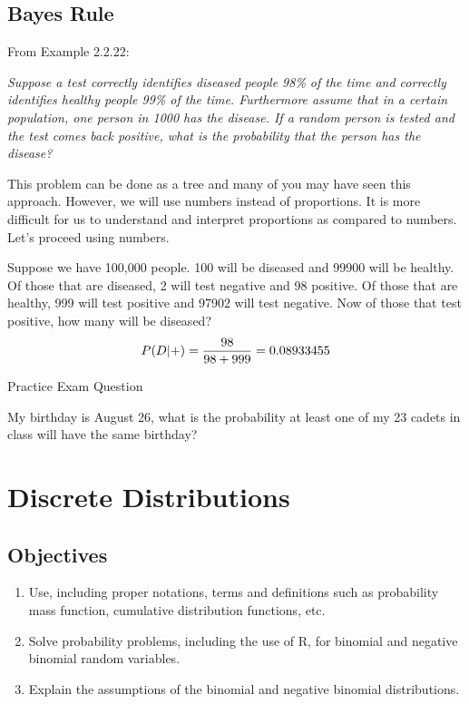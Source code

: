 \documentclass[]{book}
\providecommand{\tightlist}{%
  \setlength{\itemsep}{0pt}\setlength{\parskip}{0pt}}
\theoremstyle{definition}
\theoremstyle{definition}
\theoremstyle{definition}
\theoremstyle{remark}
\begin{document}
\subsection{Bayes Rule}\label{bayes-rule}

From Example 2.2.22:

\emph{Suppose a test correctly identifies diseased people 98\% of the
time and correctly identifies healthy people 99\% of the time.
Furthermore assume that in a certain population, one person in 1000 has
the disease. If a random person is tested and the test comes back
positive, what is the probability that the person has the disease?}

This problem can be done as a tree and many of you may have seen this
approach. However, we will use numbers instead of proportions. It is
more difficult for us to understand and interpret proportions as
compared to numbers. Let's proceed using numbers.

Suppose we have 100,000 people. 100 will be diseased and 99900 will be
healthy. Of those that are diseased, 2 will test negative and 98
positive. Of those that are healthy, 999 will test positive and 97902
will test negative. Now of those that test positive, how many will be
diseased? \[P(D|+)={98 \over 98+999}=0.08933455\]

Practice Exam Question

My birthday is August 26, what is the probability at least one of my 23
cadets in class will have the same birthday?

\hypertarget{L7}{\section{Discrete Distributions}\label{L7}}

\subsection{Objectives}\label{objectives-6}

\begin{enumerate}
\def\labelenumi{\arabic{enumi}.}
\tightlist
\item
  Use, including proper notations, terms and definitions such as
  probability mass function, cumulative distribution functions, etc.\\
\item
  Solve probability problems, including the use of R, for binomial and
  negative binomial random variables.\\
\item
  Explain the assumptions of the binomial and negative binomial
  distributions.
\end{enumerate}
\end{document}
